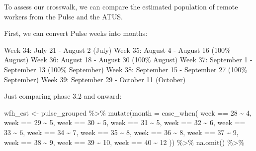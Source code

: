 \documentclass[
]{article}
\newenvironment{Shaded}{\begin{snugshade}}{\end{snugshade}}
\newcommand{\AttributeTok}[1]{\textcolor[rgb]{0.77,0.63,0.00}{#1}}
\newcommand{\DecValTok}[1]{\textcolor[rgb]{0.00,0.00,0.81}{#1}}
\newcommand{\FunctionTok}[1]{\textcolor[rgb]{0.00,0.00,0.00}{#1}}
\newcommand{\NormalTok}[1]{#1}
\newcommand{\OtherTok}[1]{\textcolor[rgb]{0.56,0.35,0.01}{#1}}
\newcommand{\SpecialCharTok}[1]{\textcolor[rgb]{0.00,0.00,0.00}{#1}}
\begin{document}
To assess our crosswalk, we can compare the estimated population of
remote workers from the Pulse and the ATUS.

First, we can convert Pulse weeks into months:

Week 34: July 21 - August 2 (July) Week 35: August 4 - August 16 (100\%
August) Week 36: August 18 - August 30 (100\% August) Week 37: September
1 - September 13 (100\% September) Week 38: September 15 - September 27
(100\% September) Week 39: September 29 - October 11 (October)

Just comparing phase 3.2 and onward:

\begin{Shaded}
\begin{Highlighting}[]
\NormalTok{wfh\_est }\OtherTok{\textless{}{-}}\NormalTok{ pulse\_grouped }\SpecialCharTok{\%\textgreater{}\%}
  \FunctionTok{mutate}\NormalTok{(}\AttributeTok{month =} \FunctionTok{case\_when}\NormalTok{(}
\NormalTok{    week }\SpecialCharTok{==} \DecValTok{28} \SpecialCharTok{\textasciitilde{}} \DecValTok{4}\NormalTok{,}
\NormalTok{    week }\SpecialCharTok{==} \DecValTok{29} \SpecialCharTok{\textasciitilde{}} \DecValTok{5}\NormalTok{,}
\NormalTok{    week }\SpecialCharTok{==} \DecValTok{30} \SpecialCharTok{\textasciitilde{}} \DecValTok{5}\NormalTok{,}
\NormalTok{    week }\SpecialCharTok{==} \DecValTok{31} \SpecialCharTok{\textasciitilde{}} \DecValTok{5}\NormalTok{,}
\NormalTok{    week }\SpecialCharTok{==} \DecValTok{32} \SpecialCharTok{\textasciitilde{}} \DecValTok{6}\NormalTok{,}
\NormalTok{    week }\SpecialCharTok{==} \DecValTok{33} \SpecialCharTok{\textasciitilde{}} \DecValTok{6}\NormalTok{,}
\NormalTok{    week }\SpecialCharTok{==} \DecValTok{34} \SpecialCharTok{\textasciitilde{}} \DecValTok{7}\NormalTok{,}
\NormalTok{    week }\SpecialCharTok{==} \DecValTok{35} \SpecialCharTok{\textasciitilde{}} \DecValTok{8}\NormalTok{,}
\NormalTok{    week }\SpecialCharTok{==} \DecValTok{36} \SpecialCharTok{\textasciitilde{}} \DecValTok{8}\NormalTok{,}
\NormalTok{    week }\SpecialCharTok{==} \DecValTok{37} \SpecialCharTok{\textasciitilde{}} \DecValTok{9}\NormalTok{,}
\NormalTok{    week }\SpecialCharTok{==} \DecValTok{38} \SpecialCharTok{\textasciitilde{}} \DecValTok{9}\NormalTok{,}
\NormalTok{    week }\SpecialCharTok{==} \DecValTok{39} \SpecialCharTok{\textasciitilde{}} \DecValTok{10}\NormalTok{,}
\NormalTok{    week }\SpecialCharTok{==} \DecValTok{40} \SpecialCharTok{\textasciitilde{}} \DecValTok{12}
\NormalTok{  )) }\SpecialCharTok{\%\textgreater{}\%}
  \FunctionTok{na.omit}\NormalTok{() }\SpecialCharTok{\%\textgreater{}\%}

\end{Highlighting}
\end{Shaded}
\end{document}
